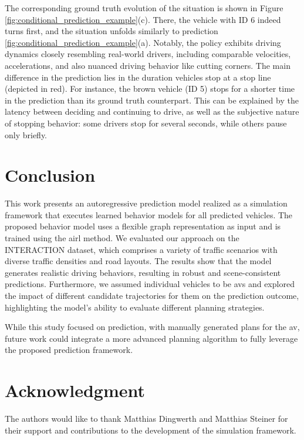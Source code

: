 \documentclass[a4paper,12pt,onecolumn]{article}
\begin{document}
The corresponding ground truth evolution of the situation is shown in Figure \ref{fig:conditional_prediction_example}(c). There, the vehicle with ID 6 indeed turns first, and the situation unfolds similarly to prediction \ref{fig:conditional_prediction_example}(a). 
Notably, the policy exhibits driving dynamics closely resembling real-world drivers, including comparable velocities, accelerations, and also nuanced driving behavior like cutting corners. 
The main difference in the prediction lies in the duration vehicles stop at a stop line (depicted in red). For instance, the brown vehicle (ID 5) stops for a shorter time in the prediction than its ground truth counterpart.  
This can be explained by the latency between deciding and continuing to drive, as well as the subjective nature of stopping behavior: some drivers stop for several seconds, while others pause only briefly. 


\section{Conclusion}
This work presents an autoregressive prediction model realized as a simulation framework that executes learned behavior models for all predicted vehicles. The proposed behavior model uses a flexible graph representation as input and is trained using the \gls{airl} method. 
We evaluated our approach on the INTERACTION dataset, which comprises a variety of traffic scenarios with diverse traffic densities and road layouts. The results show that the model generates realistic driving behaviors, resulting in robust and scene-consistent predictions. Furthermore, we assumed individual vehicles to be \gls{av}s and explored the impact of different candidate trajectories for them on the prediction outcome, highlighting the model's ability to evaluate different planning strategies. 

While this study focused on prediction, with manually generated plans for the \gls{av}, future work could integrate a more advanced planning algorithm to fully leverage the proposed prediction framework.


\begingroup
\fontsize{11.47}{11.4}\selectfont

\section*{Acknowledgment}
The authors would like to thank Matthias Dingwerth and Matthias Steiner for their support and contributions to the development of the simulation framework.

\vspace{-4pt}


\endgroup
\end{document}
